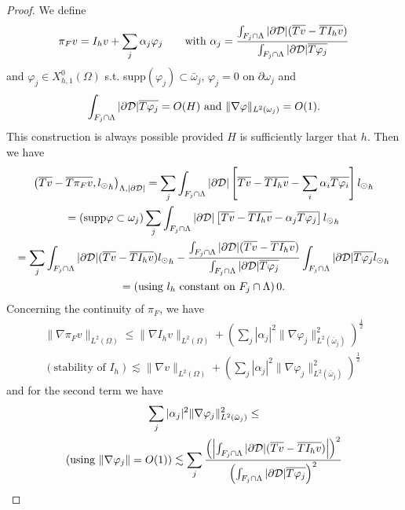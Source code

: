 \begin{proof}
We define
\begin{equation*}
\pi_F v = I_h v + \sum _j \alpha _j \varphi _j \qquad \text{with }\alpha_j =\frac{\int_{F_j \cap \Lambda}|\partial\mathcal{D}| (\overline{Tv}-\overline{TI_hv})}{\int_{F_j \cap \Lambda}|\partial\mathcal{D}|\overline{T\varphi _j}}
\end{equation*}
and $\varphi_j \in X_{h,1}^0(\Omega)$ s.t. supp$(\varphi_j)\subset \bar{\omega}_j$, $\varphi_j =0$ on $\partial \omega _j$ and 
\begin{equation*}
 \int_{F_j\cap \Lambda}|\partial\mathcal{D}|\overline{T\varphi_j}=O(H) \text{ and } \|\nabla \varphi\|_{L^2(\omega _j)}=O(1). 
\end{equation*}
This construction is always possible provided $H$ is sufficiently larger that $h$.
Then we have
\begin{multline*}
\left(\overline{T v} - \overline{T \pi _F v}  , {l_{\odot}}_h\right)_{\Lambda, |\partial\mathcal{D}|} 
= \sum _j \int_{F_j\cap \Lambda} |\partial\mathcal{D} |\left[ \overline{Tv}-\overline{TI_hv}-\sum _i \alpha_i \overline{T\varphi _i} \right]{l_{\odot}}_h \\
=(\text{supp} \varphi \subset \omega_j) \sum _j \int_{F_j\cap \Lambda}|\partial\mathcal{D}| \left[ \overline{Tv}-\overline{TI_hv}-\alpha_j \overline{T\varphi _j} \right]{l_{\odot}}_h\\
=\sum _j \int_{F_j\cap \Lambda} |\partial\mathcal{D}| (\overline{Tv}-\overline{T I_h v}) {l_{\odot}}_h - \frac{\int_{F_j\cap \Lambda} |\partial\mathcal{D}| (\overline{Tv}-\overline{TI_hv})}{\int_{F_j\cap \Lambda}|\partial\mathcal{D}|\overline{T\varphi_j}} \int_{F_j\cap \Lambda} |\partial\mathcal{D}|\overline{T\varphi _j}{l_{\odot}}_h\\ 
=(\text{using $l_h$ constant on $F_j\cap \Lambda$})\,0.
\end{multline*}
Concerning the continuity of $\pi_F$, we have
\begin{multline*}
\|\nabla \pi_F v \|_{L^2(\Omega)} \leq \|\nabla I_h v\|_{L^2(\Omega)} + \left(\sum_j|\alpha_j|^2\|\nabla \varphi _j\|^2_{L^2(\bar{\omega}_j)}\right)^{\frac 12}\\
(\text{stability of }I_h)\lesssim   \|\nabla  v\|_{L^2(\Omega)} + \left(\sum_j|\alpha_j|^2\|\nabla \varphi _j\|^2_{L^2(\bar{\omega}_j)}\right)^{\frac 12}
\end{multline*}
and for the second term we have
\begin{multline*}
\sum_j|\alpha_j|^2\|\nabla \varphi _j\|^2_{L^2(\bar{\omega}_j)}\leq
\\
\left(\text{using }\|\nabla \varphi _j\|=O(1)\right) \lesssim  \sum_j \frac{\left(\left|\int_{F_j\cap \Lambda} |\DD| (\avrc{Tv}-\avrc{TI_hv})\right|\right)^2}{\left(\int_{F_j\cap \Lambda}|\DD|\avrc{T\varphi_j}\right)^2}
\\

\end{multline*}
\end{proof}
